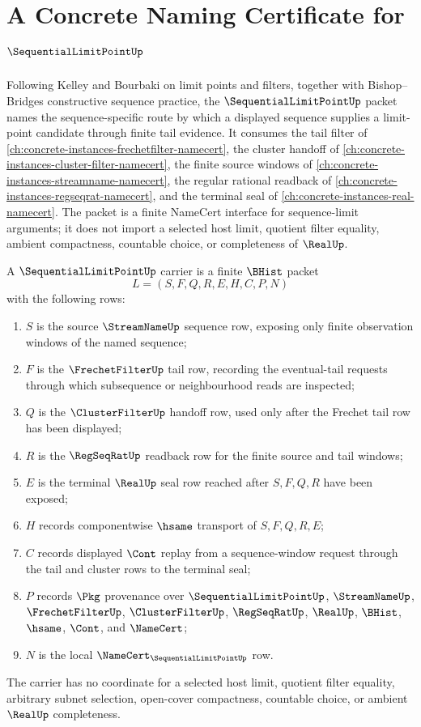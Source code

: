 \chapter{A Concrete Naming Certificate for $\SequentialLimitPointUp$}
\label{ch:concrete-instances-sequential-limit-point-namecert}

Following Kelley and Bourbaki on limit points and filters, together with Bishop--Bridges constructive sequence practice, the $\SequentialLimitPointUp$ packet names the sequence-specific route by which a displayed sequence supplies a limit-point candidate through finite tail evidence. It consumes the tail filter of \autoref{ch:concrete-instances-frechetfilter-namecert}, the cluster handoff of \autoref{ch:concrete-instances-cluster-filter-namecert}, the finite source windows of \autoref{ch:concrete-instances-streamname-namecert}, the regular rational readback of \autoref{ch:concrete-instances-regseqrat-namecert}, and the terminal seal of \autoref{ch:concrete-instances-real-namecert}. The packet is a finite NameCert interface for sequence-limit arguments; it does not import a selected host limit, quotient filter equality, ambient compactness, countable choice, or completeness of $\RealUp$.

\begin{definition}
\label{def:sequential-limit-point-carrier}
A $\SequentialLimitPointUp$ carrier is a finite $\BHist$ packet
$$
L=(S,F,Q,R,E,H,C,P,N)
$$
with the following rows:
\begin{enumerate}
\item $S$ is the source $\StreamNameUp$ sequence row, exposing only finite observation windows of the named sequence;
\item $F$ is the $\FrechetFilterUp$ tail row, recording the eventual-tail requests through which subsequence or neighbourhood reads are inspected;
\item $Q$ is the $\ClusterFilterUp$ handoff row, used only after the Frechet tail row has been displayed;
\item $R$ is the $\RegSeqRatUp$ readback row for the finite source and tail windows;
\item $E$ is the terminal $\RealUp$ seal row reached after $S,F,Q,R$ have been exposed;
\item $H$ records componentwise $\hsame$ transport of $S,F,Q,R,E$;
\item $C$ records displayed $\Cont$ replay from a sequence-window request through the tail and cluster rows to the terminal seal;
\item $P$ records $\Pkg$ provenance over $\SequentialLimitPointUp$, $\StreamNameUp$, $\FrechetFilterUp$, $\ClusterFilterUp$, $\RegSeqRatUp$, $\RealUp$, $\BHist$, $\hsame$, $\Cont$, and $\NameCert$;
\item $N$ is the local $\NameCert_{\SequentialLimitPointUp}$ row.
\end{enumerate}
The carrier has no coordinate for a selected host limit, quotient filter equality, arbitrary subnet selection, open-cover compactness, countable choice, or ambient $\RealUp$ completeness.
\end{definition}

